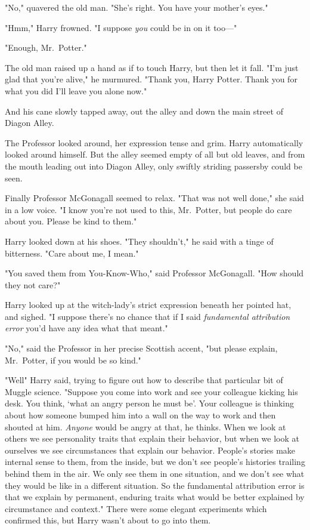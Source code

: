 "No," quavered the old man. "She's right. You have your mother's eyes."

"Hmm," Harry frowned. "I suppose \emph{you} could be in on it too—"

"Enough, Mr.~Potter."

The old man raised up a hand as if to touch Harry, but then let it fall. "I'm
just glad that you're alive," he murmured. "Thank you, Harry Potter. Thank you
for what you did{\el} I'll leave you alone now."

And his cane slowly tapped away, out the alley and down the main street of
Diagon Alley.

The Professor looked around, her expression tense and grim. Harry automatically
looked around himself. But the alley seemed empty of all but old leaves, and
from the mouth leading out into Diagon Alley, only swiftly striding passersby
could be seen.

Finally Professor McGonagall seemed to relax. "That was not well done," she
said in a low voice. "I know you're not used to this, Mr.~Potter, but people do
care about you. Please be kind to them."

Harry looked down at his shoes. "They shouldn't," he said with a tinge of
bitterness. "Care about me, I mean."

"You saved them from You-Know-Who," said Professor McGonagall. "How should they
not care?"

Harry looked up at the witch-lady's strict expression beneath her pointed hat,
and sighed. "I suppose there's no chance that if I said \emph{fundamental
attribution error} you'd have any idea what that meant."

"No," said the Professor in her precise Scottish accent, "but please explain,
Mr.~Potter, if you would be so kind."

"Well{\el}" Harry said, trying to figure out how to describe that particular
bit of Muggle science. "Suppose you come into work and see your colleague
kicking his desk. You think, `what an angry person he must be'. Your colleague
is thinking about how someone bumped him into a wall on the way to work and
then shouted at him. \emph{Anyone} would be angry at that, he thinks. When we
look at others we see personality traits that explain their behavior, but when
we look at ourselves we see circumstances that explain our behavior. People's
stories make internal sense to them, from the inside, but we don't see people's
histories trailing behind them in the air. We only see them in one situation,
and we don't see what they would be like in a different situation. So the
fundamental attribution error is that we explain by permanent, enduring traits
what would be better explained by circumstance and context." There were some
elegant experiments which confirmed this, but Harry wasn't about to go into
them.

